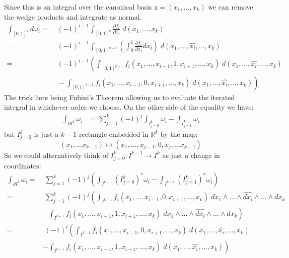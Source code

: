 Since this is an integral over the canonical basis $\text{x} = (x_1, \ldots, x_k)$ we can remove the wedge products and
integrate as normal.
\begin{align*}
	\int_{[0,1]^k} d\omega_i
		=&\; (-1)^{i-1} \int_{[0,1]^k} \frac{\partial f_i}{\partial x_i}\; d(x_1, \ldots, x_k) \\
		=&\; (-1)^{i-1} \int_{[0,1]^{k-1}} \left( \int_0^1 \frac{\partial f_i}{\partial x_i} dx_i \right) 
			\;d(x_1, \ldots, \widehat{x_i}, \ldots, x_k)\\
		=&\; (-1)^{i-1}\left( \int_{[0,1]^{k-1}} f_i(x_1, \ldots, x_{i-1}, 1, x_{i+1}, \ldots, x_k)
			\;d(x_1, \ldots, \widehat{x_i}, \ldots, x_k) \right.\\
		&\;	- \left. \int_{[0,1]^{k-1}} f_i(x_1, \ldots, x_{i-1}, 0, x_{i+1}, \ldots, x_k)
			\;d(x_1, \ldots, \widehat{x_i}, \ldots, x_k) \right)
\end{align*}
The trick here being Fubini's Theorem allowing us to evaluate the iterated integral in whichever order we choose.
On the other side of the equality we have:
\begin{align*}
	\int_{\partial I^k} \omega_i
		&= \sum_{j=1}^k (-1)^j \int_{I^k_{j=0}} \omega_i - \int_{I^k_{j=1}} \omega_i
\end{align*}
but $I^k_{j=0}$ is just a $k-1$-rectangle embedded in $\mathbb{R}^k$ by the map:
\begin{equation*}
	(x_1, \ldots x_{k-1}) \mapsto (x_1, \ldots, x_{j-1}, 0, x_{j}, \ldots x_{k-1})
\end{equation*}
So we could alternatively think of $I^k_{j=0}: I^{k-1} \to I^k$ as just a change in coordinates:
\begin{align*}
	\int_{\partial I^k} \omega_i 
		=&\; \sum_{j=1}^k (-1)^j 
			\left(\int_{I^{k-1}} (I^k_{j=0})^*\omega_i - \int_{I^{k-1}} (I^k_{j=1})^* \omega_i \right) \\
		=&\; \sum_{j=1}^k (-1)^j 
			\left(\int_{I^{k-1}} f_i (x_1, \ldots, x_{i-1}, 0, x_{i+1}, \ldots, x_k)
				\;dx_1 \wedge \ldots \wedge \widehat{dx_i} \wedge  \ldots \wedge dx_k \right. \\
		&	\left. - \int_{I^{k-1}} f_i (x_1, \ldots, x_{i-1}, 1, x_{i+1}, \ldots, x_k)
				\;dx_1 \wedge \ldots \wedge \widehat{dx_i} \wedge  \ldots \wedge dx_k \right)\\
		=&\; (-1)^i \left(\int_{I^{k-1}} f_i (x_1, \ldots, x_{i-1}, 0, x_{i+1}, \ldots, x_k)
				\;d(x_1, \ldots,\widehat{x_i},  \ldots, x_k) \right. \\
		&	\left. - \int_{I^{k-1}} f_i (x_1, \ldots, x_{i-1}, 1, x_{i+1}, \ldots, x_k)
				\;d(x_1, \ldots,\widehat{x_i},  \ldots, x_k) \right)
\end{align*}



